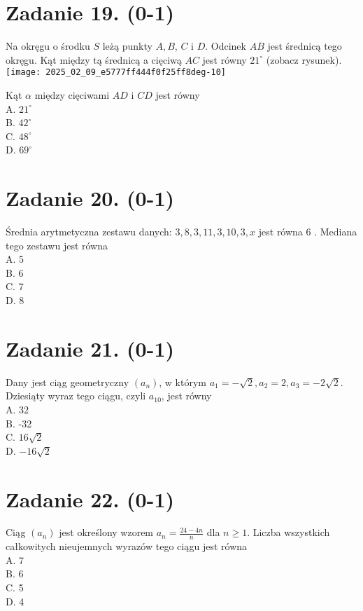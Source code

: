 \documentclass[10pt]{article}
\begin{document}
\section*{Zadanie 19. (0-1)}
Na okręgu o środku \(S\) leżą punkty \(A, B\), \(C\) i \(D\). Odcinek \(A B\) jest średnicą tego okręgu. Kąt między tą średnicą a cięciwą \(A C\) jest równy \(21^{\circ}\) (zobacz rysunek).\\
\texttt{[image: 2025\_02\_09\_e5777ff444f0f25ff8deg-10]}

Kąt \(\alpha\) między cięciwami \(A D\) i \(C D\) jest równy\\
A. \(21^{\circ}\)\\
B. \(42^{\circ}\)\\
C. \(48^{\circ}\)\\
D. \(69^{\circ}\)

\section*{Zadanie 20. (0-1)}
Średnia arytmetyczna zestawu danych: \(3,8,3,11,3,10,3, x\) jest równa 6 . Mediana tego zestawu jest równa\\
A. 5\\
B. 6\\
C. 7\\
D. 8

\section*{Zadanie 21. (0-1)}
Dany jest ciąg geometryczny \(\left(a_{n}\right)\), w którym \(a_{1}=-\sqrt{2}, a_{2}=2, a_{3}=-2 \sqrt{2}\). Dziesiąty wyraz tego ciągu, czyli \(a_{10}\), jest równy\\
A. 32\\
B. -32\\
C. \(16 \sqrt{2}\)\\
D. \(-16 \sqrt{2}\)

\section*{Zadanie 22. (0-1)}
Ciąg \(\left(a_{n}\right)\) jest określony wzorem \(a_{n}=\frac{24-4 n}{n}\) dla \(n \geq 1\). Liczba wszystkich całkowitych nieujemnych wyrazów tego ciągu jest równa\\
A. 7\\
B. 6\\
C. 5\\
D. 4
\end{document}

